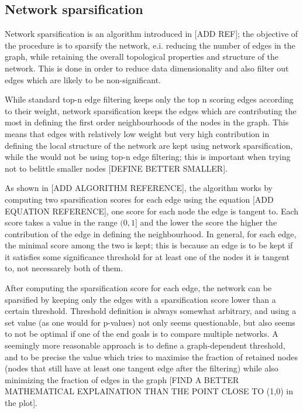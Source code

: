 \subsection{Network sparsification}
Network sparsification is an algorithm introduced in [ADD REF]; the objective of the procedure is to sparsify the network, e.i. reducing the number of edges in the graph, while retaining the overall topological properties and structure of the network. This is done in order to reduce data dimensionality and also filter out edges which are likely to be non-significant.

While standard top-n edge filtering keeps only the top n scoring edges according to their weight, network sparsification keeps the edges which are contributing the most in defining the first order neighbourhoods of the nodes in the graph. This means that edges with relatively low weight but very high contribution in defining the local structure of the network are kept using network sparsification, while the would not be using top-n edge filtering; this is important when trying not to belittle smaller nodes [DEFINE BETTER SMALLER].

As shown in [ADD ALGORITHM REFERENCE], the algorithm works by computing two sparsification scores for each edge using the equation [ADD EQUATION REFERENCE], one score for each node the edge is tangent to. 
Each score takes a value in the range $(0,1]$ and the lower the score the higher the contribution of the edge in defining the neighbourhood. In general, for each edge, the minimal score among the two is kept; this is because an edge is to be kept if it satisfies some significance threshold for at least one of the nodes it is tangent to, not necessarely both of them. 

After computing the sparsification score for each edge, the network can be sparsified by keeping only the edges with a sparsification score lower than a certain threshold. Threshold definition is always somewhat arbitrary, and using a set value (as one would for p-values) not only seems questionable, but also seems to not be optimal if one of the end goals is to compare multiple networks. A seemingly more reasonable approach is to define a graph-dependent threshold, and to be precise the value which tries to maximise the fraction of retained nodes (nodes that still have at least one tangent edge after the filtering) while also minimizing the fraction of edges in the graph [FIND A BETTER MATHEMATICAL EXPLAINATION THAN THE POINT CLOSE TO (1,0) in the plot].

